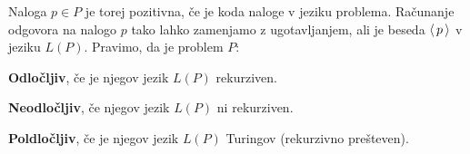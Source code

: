 \documentclass[10pt,a4paper,oneside]{book}
\begin{document}
\br
Naloga $p \in P$ je torej pozitivna, če je koda naloge v jeziku problema. Računanje odgovora na nalogo $p$ tako lahko zamenjamo z ugotavljanjem, ali je beseda $\langle\,{p}\,\rangle$ v jeziku $L(P)$.
\br
Pravimo, da je problem $P$:
\begin{items}
\item \textbf{Odločljiv}, če je njegov jezik $L(P)$ rekurziven.
\item \textbf{Neodločljiv}, če njegov jezik $L(P)$ ni rekurziven.
\item \textbf{Poldločljiv}, če je njegov jezik $L(P)$ Turingov (rekurzivno prešteven).%
\end{items}
\end{document}
